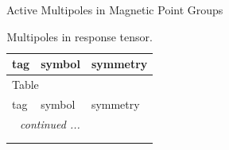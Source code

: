 \documentclass[fleqn,9pt,landscape]{jsarticle}
\begin{document}
\setcounter{MaxMatrixCols}{32}

\renewcommand{\tablename}{Table~}
\renewcommand{\figurename}{Figure~}
\begin{center}
\LARGE
Active Multipoles in Magnetic Point Groups
\end{center}
\renewcommand{\arraystretch}{1.6}
\begin{longtable}{lll}
\caption{Multipoles in response tensor.}
 \\
 \hline \hline
tag & symbol & symmetry \\ \hline \endfirsthead

\multicolumn{2}{l}{\tablename\ \thetable{}} \\
 \hline \hline
tag & symbol & symmetry \\ \hline \endhead

 \hline \hline
\multicolumn{2}{r}{\footnotesize\it continued ...} \\ \endfoot

 \hline \hline
\multicolumn{2}{r}{} \\ \endlastfoot


\end{longtable}
\end{document}
